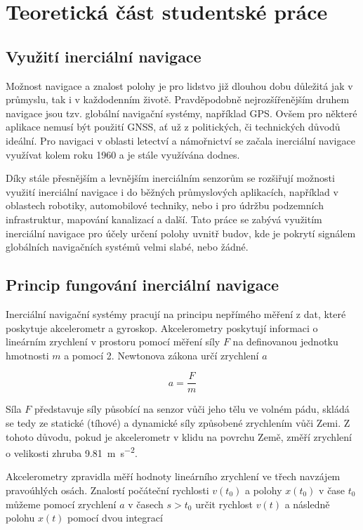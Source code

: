 \chapter{Teoretická část studentské práce}
\section{Využití inerciální navigace}
Možnost navigace a znalost polohy je pro lidstvo již dlouhou dobu důležitá jak v průmyslu, tak i v každodenním životě. Pravděpodobně nejrozšířenějším druhem navigace jsou tzv. globální navigační systémy, například GPS. Ovšem pro některé aplikace nemusí být použití GNSS, ať už z politických, či technických důvodů ideální. Pro navigaci v oblasti letectví a námořnictví se začala inerciální navigace využívat kolem roku 1960 a je stále využívána dodnes. \cite{Tittertonc2004}

Díky stále přesnějším a levnějším inerciálním senzorům se rozšiřují možnosti využití inerciální navigace i do běžných průmyslových aplikacích, například v oblastech robotiky, automobilové techniky, nebo i pro údržbu podzemních infrastruktur, mapování kanalizací a další. \cite{Tittertonc2004} Tato práce se zabývá využitím inerciální navigace pro účely určení polohy uvnitř budov, kde je pokrytí signálem globálních navigačních systémů velmi slabé, nebo žádné.

\section{Princip fungování inerciální navigace} \label{INSPrinciple}
Inerciální navigační systémy pracují na principu nepřímého měření z dat, které poskytuje akcelerometr a gyroskop.   
Akcelerometry poskytují informaci o lineárním zrychlení v prostoru pomocí měření síly $ F $ na definovanou jednotku hmotnosti $ m $ a pomocí 2. Newtonova zákona určí zrychlení $ a $ \cite{Tittertonc2004}

\begin{equation}
a=\frac{F}{m}
\end{equation}

Síla $ F $ představuje síly působící na senzor vůči jeho tělu ve volném pádu, skládá se tedy ze statické (tíhové) a dynamické síly způsobené zrychlením vůči Zemi. \cite{Tittertonc2004}
Z tohoto důvodu, pokud je akcelerometr v klidu na povrchu Země, změří zrychlení o velikosti zhruba \SI{9,81}{\meter\per\second\squared}.

Akcelerometry zpravidla měří hodnoty lineárního zrychlení ve třech navzájem pravoúhlých osách. Znalostí počáteční rychlosti $ v(t_{0}) $ a polohy $ x(t_{0}) $ v čase $ t_{0} $ můžeme pomocí zrychlení $ a $ v časech $ s>t_{0} $ určit rychlost $ v(t) $ a následně polohu $ x(t) $ pomocí dvou integrací \cite{Grewal2013}

